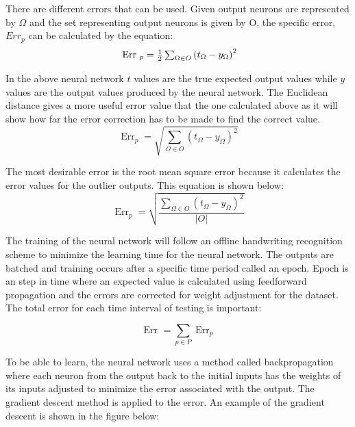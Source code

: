 There are different errors that can be used. Given output neurons are represented by $\Omega$ and the set representing output neurons is given by O, the specific error,$Err_p$ can be calculated by the equation:
\begin{equation}
	$\text { Err }$ _ { p } = \frac { 1 } { 2 } \sum_{ \Omega \in O }^{ }  \left( t _ { \Omega } - y _ { \Omega } \right) ^ { 2 }
\end{equation}

In the above neural network $t$ values are the true expected output values while $y$ values are the output values produced by the neural network. The Euclidean distance gives a more useful error value that the one calculated above as it will show how far the error correction has to be made to find the correct value. 
\begin{equation}
\operatorname {Err} _ { p } = \sqrt { \sum _ { \Omega \in O } \left( t _ { \Omega } - y _ { \Omega } \right) ^ { 2 } }
\end{equation}

The most desirable error is the root mean square error because it calculates the error values for the outlier outputs. This equation is shown below:
\begin{equation}
\operatorname { Err } _ { p } = \sqrt { \frac { \sum _ { \Omega \in O } \left( t _ { \Omega } - y _ { \Omega } \right) ^ { 2 } } { | O | } }
\end{equation}

The training of the neural network will follow an offline handwriting recognition scheme to minimize the learning time for the neural network. The outputs are batched and training occurs after a specific time period called an epoch. Epoch is an step in time where an expected value is calculated using feedforward propagation and the errors are corrected for weight adjustment for the dataset. The total error for each time interval of testing is important:

\begin{equation}
\text { Err } = \sum _ { p \in P } \operatorname { Err } _ { p }
\end{equation}

To be able to learn, the neural network uses a method called backpropagation where each neuron from the output back to the initial inputs has the weights of its inputs adjusted to minimize the error associated with the output. The gradient descent method is applied to the error. An example of the gradient descent is shown in the figure below:


